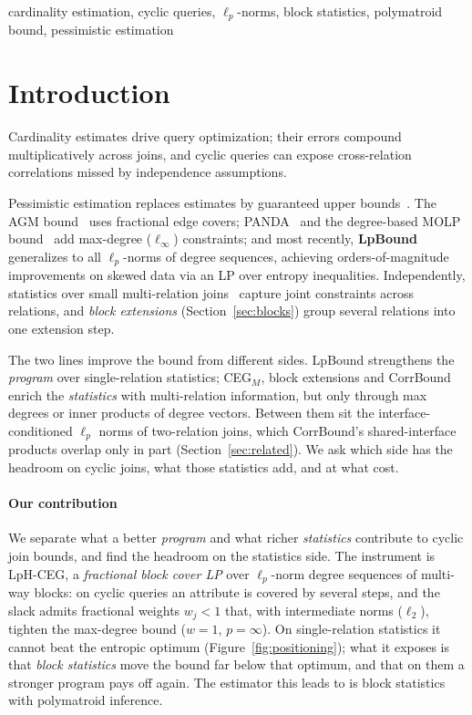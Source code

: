 \documentclass[conference]{IEEEtran}
\begin{document}
\begin{IEEEkeywords}
cardinality estimation, cyclic queries, $\ell_p$-norms, block statistics, polymatroid bound, pessimistic estimation
\end{IEEEkeywords}

\section{Introduction}
\label{sec:intro}

Cardinality estimates drive query optimization; their errors compound multiplicatively across joins, and cyclic queries can expose cross-relation correlations missed by independence assumptions.

Pessimistic estimation replaces estimates by guaranteed upper
bounds~\cite{abokhamis2025pessimistic}.
The AGM bound~\cite{atserias2008agm} uses fractional edge covers;
PANDA~\cite{abokhamis2017panda} and the degree-based MOLP
bound~\cite{joglekar2016molp} add max-degree ($\ell_\infty$)
constraints; and most recently,
\textbf{LpBound}~\cite{zhang2025lpbound} generalizes to all
$\ell_p$-norms of degree sequences, achieving orders-of-magnitude
improvements on skewed data via an LP over entropy inequalities.
Independently, statistics over small multi-relation joins~\cite{chen2022ceg,salihoglu2026ceg} capture joint constraints across relations, and \emph{block extensions} (Section~\ref{sec:blocks}) group several relations into one extension step.

The two lines improve the bound from different sides. LpBound strengthens
the \emph{program} over single-relation statistics; CEG$_M$, block
extensions and CorrBound~\cite{mayer2026corrbound} enrich the
\emph{statistics} with multi-relation information, but only through max
degrees or inner products of degree vectors. Between them sit the
interface-conditioned $\ell_p$ norms of two-relation joins, which
CorrBound's shared-interface products overlap only in part
(Section~\ref{sec:related}). We ask which side has the headroom on
cyclic joins, what those statistics add, and at what cost.

\paragraph{Our contribution}
We separate what a better \emph{program} and what richer
\emph{statistics} contribute to cyclic join bounds, and find the
headroom on the statistics side. The instrument is LpH-CEG, a
\emph{fractional block cover LP} over $\ell_p$-norm degree sequences of
multi-way blocks: on cyclic queries an attribute is covered by several
steps, and the slack admits fractional weights $w_j<1$ that, with
intermediate norms ($\ell_2$), tighten the max-degree bound ($w{=}1$,
$p{=}\infty$). On single-relation statistics it cannot beat the entropic
optimum (Figure~\ref{fig:positioning}); what it exposes is that
\emph{block statistics} move the bound far below that optimum, and that
on them a stronger program pays off again. The estimator this leads to
is block statistics with polymatroid inference.
\end{document}
